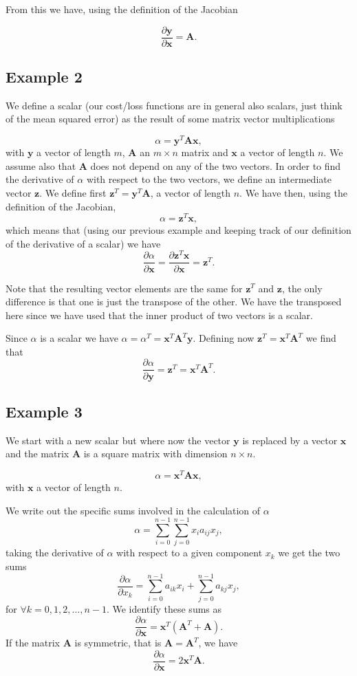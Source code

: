 \documentclass[%
oneside,                 %
final,                   %
10pt]{article}
\begin{document}
From this we have, using the definition of the Jacobian

\[
\frac{\partial \bm{y} }{\partial \bm{x}}= \bm{A}.
\]

\subsection{Example 2}

We define a scalar (our cost/loss functions are in general also scalars,
just think of the mean squared error) as the result of some matrix vector
multiplications

\[
\alpha = \bm{y}^T\bm{A}\bm{x},
\]
with $\bm{y}$ a vector of length $m$, $\bm{A}$ an $m\times n$ matrix and $\bm{x}$ a vector of length $n$. We assume also that $\bm{A}$ does not depend on any of the two vectors.
In order to find the derivative of $\alpha$ with respect to the two vectors, we define an intermediate vector $\bm{z}$. We define first
$\bm{z}^T=\bm{y}^T\bm{A}$, a vector of length $n$. We have then, using the definition of the Jacobian,
\[
\alpha = \bm{z}^T\bm{x},
\]
which means that (using our previous example and keeping track of our definition of the derivative of a scalar) we have
\[
\frac{\partial \alpha}{\partial \bm{x}} = \frac{\partial \bm{z}^T\bm{x}}{\partial \bm{x}}=\bm{z}^T.
\]

Note that the resulting vector elements are the same for $\bm{z}^T$ and $\bm{z}$, the only difference is that one is just the transpose of the other. We have the transposed here since we have used that the inner product of two vectors is a scalar.

Since $\alpha$ is a scalar we have $\alpha =\alpha^T=\bm{x}^T\bm{A}^T\bm{y}$. Defining now $\bm{z}^T=\bm{x}^T\bm{A}^T$ we find that
\[
\frac{\partial \alpha}{\partial \bm{y}} = \bm{z}^T=\bm{x}^T\bm{A}^T.
\]

\subsection{Example 3}

We start with a new scalar but where now the vector $\bm{y}$ is
replaced by a vector $\bm{x}$ and the matrix $\bm{A}$ is a square
matrix with dimension $n\times n$.

\[
\alpha = \bm{x}^T\bm{A}\bm{x},
\]
with $\bm{x}$ a vector of length $n$.

We write out the specific sums involved in the calculation of $\alpha$
\[
\alpha = \sum_{i=0}^{n-1}\sum_{j=0}^{n-1}x_i a_{ij}x_j, 
\]
taking the derivative of $\alpha$ with respect to a given component $x_k$ we get the two sums
\[
\frac{\partial \alpha}{\partial x_k}  = \sum_{i=0}^{n-1}a_{ik}x_i+\sum_{j=0}^{n-1}a_{kj}x_j, 
\]
for $\forall k =0,1,2,\dots,n-1$. We identify these sums as
\[
\frac{\partial \alpha}{\partial \bm{x}}  = \bm{x}^T\left(\bm{A}^T+\bm{A}\right).
\]
If the matrix $\bm{A}$ is symmetric, that is $\bm{A}=\bm{A}^T$, we have 
\[
\frac{\partial \alpha}{\partial \bm{x}}  = 2\bm{x}^T\bm{A}.
\]
\end{document}
